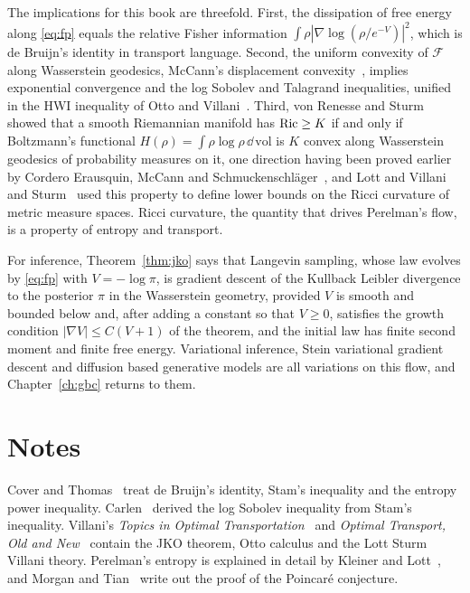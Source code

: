 The implications for this book are threefold. First, the dissipation of free energy along \eqref{eq:fp} equals the relative Fisher information $\int\rho|\nabla\log(\rho/e^{-V})|^2$, which is de Bruijn's identity in transport language. Second, the uniform convexity of $\mathcal{F}$ along Wasserstein geodesics, McCann's displacement convexity~\cite{mccann1997}, implies exponential convergence and the log Sobolev and Talagrand inequalities, unified in the HWI inequality of Otto and Villani~\cite{ottovillani2000}. Third, von Renesse and Sturm~\cite{vonrenesse2005} showed that a smooth Riemannian manifold has $\mathrm{Ric}\geq K$ if and only if Boltzmann's functional $H(\rho) = \int\rho\log\rho\,\dd\,\mathrm{vol}$ is $K$ convex along Wasserstein geodesics of probability measures on it, one direction having been proved earlier by Cordero Erausquin, McCann and Schmuckenschl\"ager~\cite{corderoerausquin2001}, and Lott and Villani~\cite{lottvillani2009} and Sturm~\cite{sturm2006} used this property to define lower bounds on the Ricci curvature of metric measure spaces. Ricci curvature, the quantity that drives Perelman's flow, is a property of entropy and transport.

For inference, Theorem~\ref{thm:jko} says that Langevin sampling, whose law evolves by \eqref{eq:fp} with $V = -\log\pi$, is gradient descent of the Kullback Leibler divergence to the posterior $\pi$ in the Wasserstein geometry, provided $V$ is smooth and bounded below and, after adding a constant so that $V\geq0$, satisfies the growth condition $|\nabla V|\leq C(V+1)$ of the theorem, and the initial law has finite second moment and finite free energy. Variational inference, Stein variational gradient descent and diffusion based generative models are all variations on this flow, and Chapter~\ref{ch:gbc} returns to them.



\section*{Notes}

Cover and Thomas~\cite{covertomas} treat de Bruijn's identity, Stam's inequality and the entropy power inequality. Carlen~\cite{carlen1991} derived the log Sobolev inequality from Stam's inequality. Villani's \emph{Topics in Optimal Transportation}~\cite{villani2003} and \emph{Optimal Transport, Old and New}~\cite{villani2009} contain the JKO theorem, Otto calculus and the Lott Sturm Villani theory. Perelman's entropy is explained in detail by Kleiner and Lott~\cite{kleinerlott2008}, and Morgan and Tian~\cite{morgan2007} write out the proof of the Poincar\'e conjecture.
